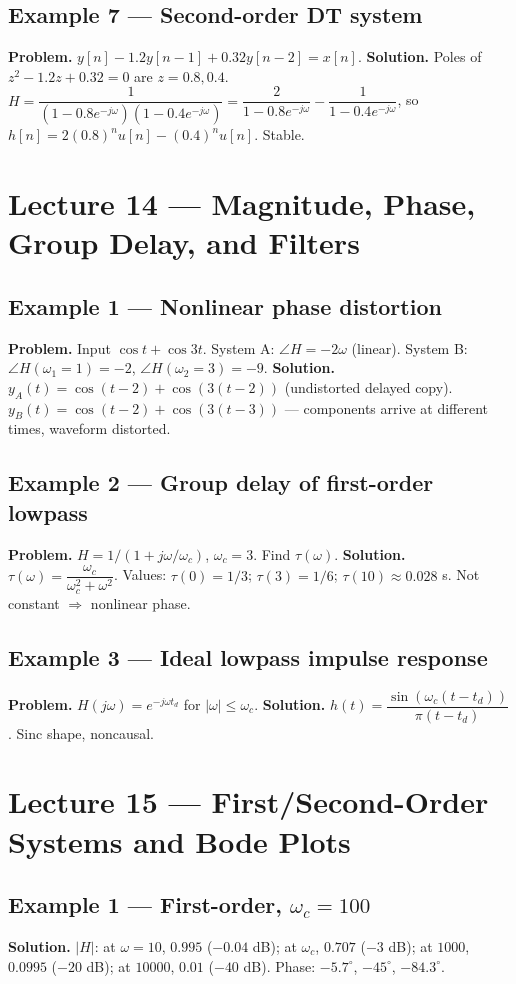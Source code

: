 \documentclass[11pt]{article}
\begin{document}
\subsection{Example 7 --- Second-order DT system}
\textbf{Problem.} $y[n]-1.2y[n-1]+0.32y[n-2]=x[n]$.
\textbf{Solution.} Poles of $z^2-1.2z+0.32=0$ are $z=0.8,0.4$. $H=\dfrac{1}{(1-0.8e^{-j\omega})(1-0.4e^{-j\omega})}=\dfrac{2}{1-0.8e^{-j\omega}}-\dfrac{1}{1-0.4e^{-j\omega}}$, so $h[n]=2(0.8)^n u[n]-(0.4)^n u[n]$. Stable.

\section{Lecture 14 --- Magnitude, Phase, Group Delay, and Filters}

\subsection{Example 1 --- Nonlinear phase distortion}
\textbf{Problem.} Input $\cos t+\cos 3t$. System A: $\angle H=-2\omega$ (linear). System B: $\angle H(\omega_1=1)=-2$, $\angle H(\omega_2=3)=-9$.
\textbf{Solution.} $y_A(t)=\cos(t-2)+\cos(3(t-2))$ (undistorted delayed copy). $y_B(t)=\cos(t-2)+\cos(3(t-3))$ --- components arrive at different times, waveform distorted.

\subsection{Example 2 --- Group delay of first-order lowpass}
\textbf{Problem.} $H=1/(1+j\omega/\omega_c)$, $\omega_c=3$. Find $\tau(\omega)$.
\textbf{Solution.} $\tau(\omega)=\dfrac{\omega_c}{\omega_c^2+\omega^2}$. Values: $\tau(0)=1/3$; $\tau(3)=1/6$; $\tau(10)\approx 0.028$ s. Not constant $\Rightarrow$ nonlinear phase.

\subsection{Example 3 --- Ideal lowpass impulse response}
\textbf{Problem.} $H(j\omega)=e^{-j\omega t_d}$ for $|\omega|\le\omega_c$.
\textbf{Solution.} $h(t)=\dfrac{\sin(\omega_c(t-t_d))}{\pi(t-t_d)}$. Sinc shape, noncausal.

\section{Lecture 15 --- First/Second-Order Systems and Bode Plots}

\subsection{Example 1 --- First-order, $\omega_c=100$}
\textbf{Solution.} $|H|$: at $\omega=10$, $0.995$ ($-0.04$ dB); at $\omega_c$, $0.707$ ($-3$ dB); at $1000$, $0.0995$ ($-20$ dB); at $10000$, $0.01$ ($-40$ dB). Phase: $-5.7^\circ$, $-45^\circ$, $-84.3^\circ$.
\end{document}
